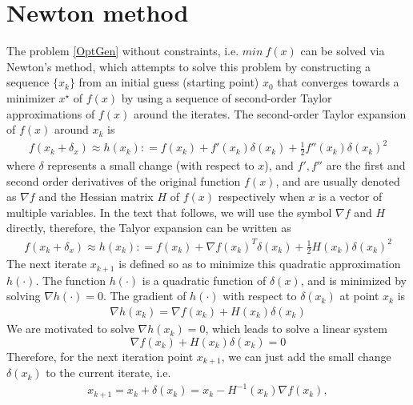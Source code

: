 \documentclass  [
  paper    = a4,
  BCOR     = 10mm,
  twoside,
  fontsize = 12pt,
  fleqn,
  toc      = bibnumbered,
  toc      = listofnumbered,
  numbers  = noendperiod,
  headings = normal,
  listof   = leveldown,
  version  = 3.03
]                                       {scrreprt}
\newcommand{\<}{\langle}
\renewcommand{\>}{\rangle}
\begin{document}
   \section{Newton method}
   The problem \ref{OptGen} without constraints, i.e. $min \  f(x)$  can be solved via Newton's method, which attempts to solve this problem by constructing a sequence $\{x_k\}$ from an initial guess (starting point) $x_0$ that converges towards a minimizer $x^\star$ of $f(x)$  by using a sequence of second-order Taylor approximations of $f(x)$ around the iterates. The second-order Taylor expansion of $f(x)$ around $x_k$ is
   \begin{align*}
   f(x_k + \delta_x) \approx h(x_k) : = f(x_k) + f'(x_k)\delta(x_k) +\frac{1}{2}f''(x_k)\delta(x_k)^2 
   \end{align*}
   where $\delta$ represents a small change (with respect to $x$), and $f', f''$ are the first and second order derivatives of the original function $f(x)$, and are usually denoted as $\nabla f$ and the Hessian matrix $H$ of $f(x)$ respectively when $x$ is a vector of multiple variables. In the text that follows, we will use the symbol $\nabla f$ and $H$ directly, therefore, the Talyor expansion can be written as 
   \begin{align*}
   f(x_k + \delta_x) \approx h(x_k) : = f(x_k) + \nabla f(x_k)^T\delta(x_k) +\frac{1}{2}H(x_k)\delta(x_k)^2 
   \end{align*}
   The next iterate $x_{k+1}$ is defined so as to minimize this quadratic approximation $h(\cdot)$. The function $h(\cdot)$ is a quadratic function of $\delta(x)$, and is minimized by solving $\nabla h(\cdot) = 0$. The gradient of $h(\cdot)$ with respect to $\delta(x_k)$ at point $x_k$ is
   \begin{align*}
   \nabla h(x_k) = \nabla f(x_k) + H(x_k) \delta(x_k) 
   \end{align*}
   We are motivated to solve $\nabla h(x_k) =0$, which leads to solve a linear system
   \begin{equation}
   \nabla f(x_k) + H(x_k) \delta(x_k) =0
   \label{HessianEq}
   \end{equation}
   Therefore, for the next iteration point $x_{k+1}$, we can just add the small change $\delta(x_k)$ to the current iterate, i.e. 
   \begin{align*}
   x_{k+1}  = x_k + \delta(x_k) = x_k - H^{-1}(x_k)\nabla f(x_k), 
   \end{align*}
\end{document}
